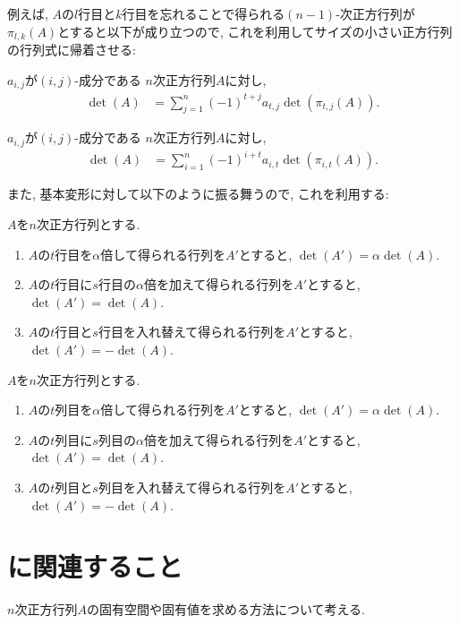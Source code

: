 例えば,
$A$の$l$行目と$k$行目を忘れることで得られる$(n-1)$-次正方行列が$\pi_{l,k}(A)$とすると以下が成り立つので,
これを利用してサイズの小さい正方行列の行列式に帰着させる:
\begin{theorem}
  \label{thm:det:row:expansion}
  $a_{i,j}$が$(i,j)$-成分である
    $n$次正方行列$A$に対し,
    \begin{align*}
      \det(A)&=
      \sum_{j=1}^{n}
      (-1)^{t+j}a_{t,j}\det(\pi_{t,j}(A)).
    \end{align*}
\end{theorem}
\begin{theorem}
  \label{thm:det:col:expansion}
  $a_{i,j}$が$(i,j)$-成分である
    $n$次正方行列$A$に対し,
    \begin{align*}
      \det(A)&=\sum_{i=1}^{n}
      (-1)^{i+t}a_{i,t}\det(\pi_{i,t}(A)).
    \end{align*}
\end{theorem}

また,
基本変形に対して以下のように振る舞うので,
これを利用する:
\begin{theorem}
  $A$を$n$次正方行列とする.
  \begin{enumerate}
  \item 

    $A$の$t$行目を$\alpha$倍して得られる行列を$A'$とすると,
    $\det(A')=\alpha \det(A)$.
  \item 
    $A$の$t$行目に$s$行目の$\alpha$倍を加えて得られる行列を$A'$とすると,
    $\det(A')=\det(A)$.
  \item 
    $A$の$t$行目と$s$行目を入れ替えて得られる行列を$A'$とすると,
    $\det(A')=-\det(A)$.
  \end{enumerate}
\end{theorem}
\begin{theorem}
  $A$を$n$次正方行列とする.
  \begin{enumerate}
  \item 
    $A$の$t$列目を$\alpha$倍して得られる行列を$A'$とすると,
    $\det(A')=\alpha \det(A)$.
  \item 
    $A$の$t$列目に$s$列目の$\alpha$倍を加えて得られる行列を$A'$とすると,
    $\det(A')=\det(A)$.
  \item 
    $A$の$t$列目と$s$列目を入れ替えて得られる行列を$A'$とすると,
    $\det(A')=-\det(A)$.
  \end{enumerate}
\end{theorem}


\section{に関連すること}
$n$次正方行列$A$の固有空間や固有値を求める方法について考える.

